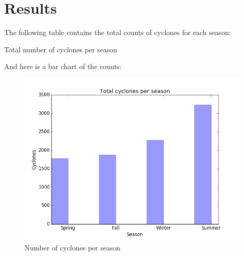 \section{Results}
\noindent
The following table contains the total counts of cyclones for each season:

\begin{table}[H]
\caption{Total number of cyclones per season}

\end{table}

And here is a bar chart of the counts:

\begin{figure}[H] 
\centering \includegraphics[scale=0.4]{../images/barchart_cyclones.png}	 
\caption{Number of cyclones per season}
\end{figure}